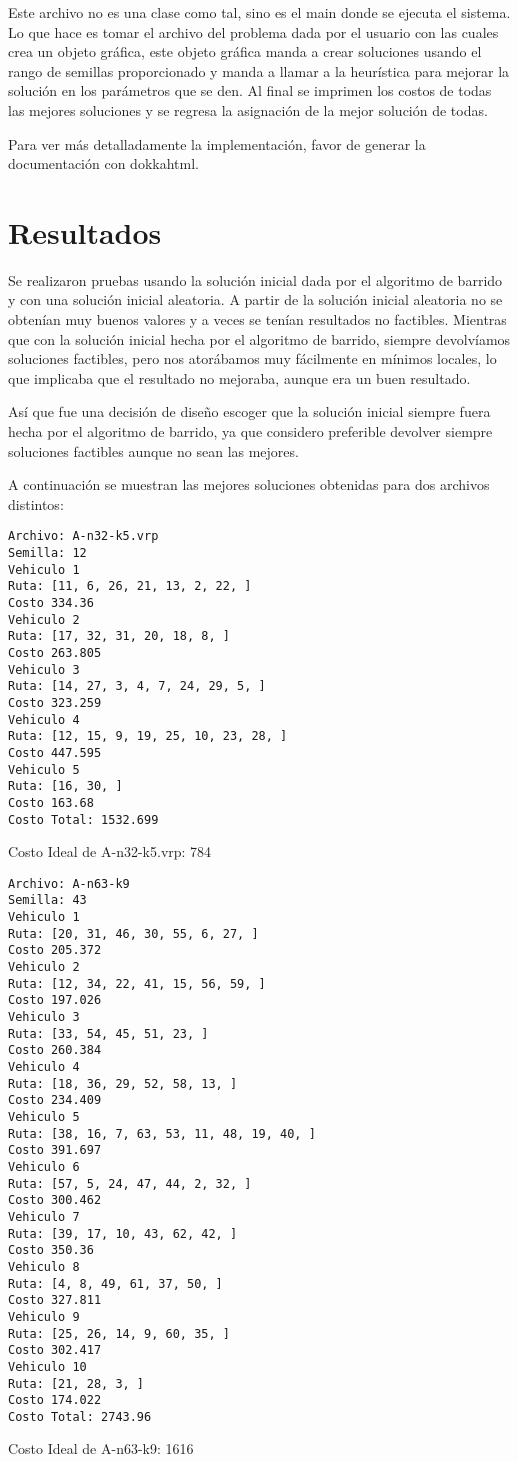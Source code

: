 \documentclass{article}
\begin{document}
\begin{itemize}
{		Este archivo no es una clase como tal, sino es el main donde se ejecuta el sistema. Lo que hace es tomar el archivo del problema dada por el usuario con las cuales crea un objeto gráfica, este objeto gráfica manda a crear soluciones usando el rango de semillas proporcionado y manda a llamar a la heurística para mejorar la solución en los parámetros que se den. Al final se imprimen los costos de todas las mejores soluciones y se regresa la asignación de la mejor solución de todas.
	}
\end{itemize}

Para ver más detalladamente la implementación, favor de generar la documentación con dokkahtml.

\section{Resultados}

Se realizaron pruebas usando la solución inicial dada por el algoritmo de barrido y con una solución inicial aleatoria. A partir de la solución inicial aleatoria no se obtenían muy buenos valores y a veces se tenían resultados no factibles. Mientras que con la solución inicial hecha por el algoritmo de barrido, siempre devolvíamos soluciones factibles, pero nos atorábamos muy fácilmente en mínimos locales, lo que implicaba que el resultado no mejoraba, aunque era un buen resultado. 

Así que fue una decisión de diseño escoger que la solución inicial siempre fuera hecha por el algoritmo de barrido, ya que considero preferible devolver siempre soluciones factibles aunque no sean las mejores.

A continuación se muestran las mejores soluciones obtenidas para dos archivos distintos:

\begin{lstlisting}
Archivo: A-n32-k5.vrp
Semilla: 12
Vehiculo 1
Ruta: [11, 6, 26, 21, 13, 2, 22, ]
Costo 334.36
Vehiculo 2
Ruta: [17, 32, 31, 20, 18, 8, ]
Costo 263.805
Vehiculo 3
Ruta: [14, 27, 3, 4, 7, 24, 29, 5, ]
Costo 323.259
Vehiculo 4
Ruta: [12, 15, 9, 19, 25, 10, 23, 28, ]
Costo 447.595
Vehiculo 5
Ruta: [16, 30, ]
Costo 163.68
Costo Total: 1532.699
\end{lstlisting}
Costo Ideal de A-n32-k5.vrp: 784

\begin{lstlisting}
Archivo: A-n63-k9
Semilla: 43
Vehiculo 1
Ruta: [20, 31, 46, 30, 55, 6, 27, ]
Costo 205.372
Vehiculo 2
Ruta: [12, 34, 22, 41, 15, 56, 59, ]
Costo 197.026
Vehiculo 3
Ruta: [33, 54, 45, 51, 23, ]
Costo 260.384
Vehiculo 4
Ruta: [18, 36, 29, 52, 58, 13, ]
Costo 234.409
Vehiculo 5
Ruta: [38, 16, 7, 63, 53, 11, 48, 19, 40, ]
Costo 391.697
Vehiculo 6
Ruta: [57, 5, 24, 47, 44, 2, 32, ]
Costo 300.462
Vehiculo 7
Ruta: [39, 17, 10, 43, 62, 42, ]
Costo 350.36
Vehiculo 8
Ruta: [4, 8, 49, 61, 37, 50, ]
Costo 327.811
Vehiculo 9
Ruta: [25, 26, 14, 9, 60, 35, ]
Costo 302.417
Vehiculo 10
Ruta: [21, 28, 3, ]
Costo 174.022
Costo Total: 2743.96
\end{lstlisting}
Costo Ideal de  A-n63-k9: 1616
\end{document}
